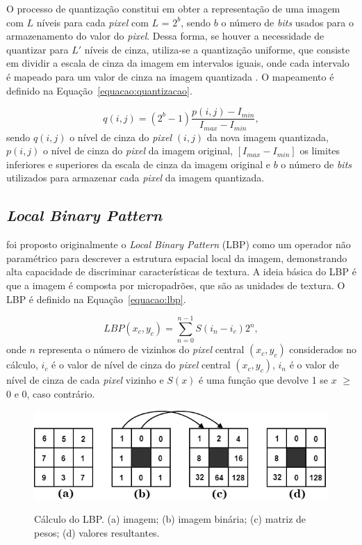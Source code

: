 O processo de quantização constitui em obter a representação de uma imagem com $L$ níveis para cada \textit{pixel} com $L$ = $2^{b}$, sendo $b$ o número de \textit{bits} usados para o armazenamento do valor do \textit{pixel}. Dessa forma, se houver a necessidade de quantizar para $L'$ níveis de cinza, utiliza-se a quantização uniforme, que consiste em dividir a escala de cinza da imagem em intervalos iguais, onde cada intervalo é mapeado para um valor de cinza na imagem quantizada \cite{gonzalez2010processamento}. O mapeamento é definido na Equação~\ref{equacao:quantizacao}.

\begin{equation}
\label{equacao:quantizacao}
q(i,j) = (2^{b} - 1) \frac{p(i,j) - I_{min}}{I_{max} - I_{min}}, 
\end{equation}
sendo $q(i,j)$ o nível de cinza do \textit{pixel} $(i,j)$ da nova imagem quantizada, $p(i,j)$ o nível de cinza do \textit{pixel} da imagem original, $[{I_{max} - I_{min}}]$ os limites inferiores e superiores da escala de cinza da imagem original e $b$ o número de \textit{bits} utilizados para armazenar cada \textit{pixel} da imagem quantizada.

\subsection{\textit{Local Binary Pattern}}

 foi proposto originalmente o \textit{Local Binary Pattern} (LBP) como um operador não paramétrico para descrever a estrutura espacial local da imagem, demonstrando alta capacidade de discriminar características de textura. A ideia básica do LBP é que a imagem é composta por micropadrões, que são as unidades de textura. O LBP é definido na Equação~\ref{equacao:lbp}.

\begin{equation}
\label{equacao:lbp}
LBP(x_{c},y_{c}) = \sum_{n=0}^{n-1}S(i_{n}-i_{c})2^{n},
\end{equation}
onde $n$ representa o número de vizinhos do \textit{pixel} central $(x_{c},y_{c})$ considerados no cálculo, $i_{c}$ é o valor de nível de cinza do \textit{pixel} central $(x_{c},y_{c})$, $i_{n}$ é o valor de nível de cinza de cada \textit{pixel} vizinho e $S(x)$ é uma função que devolve 1 se $x$ $\geq$ 0 e 0, caso contrário.

\begin{figure}[ht!]
    \centering
    \caption{Cálculo do LBP. (a) imagem; (b) imagem binária; (c) matriz de pesos; (d) valores resultantes.}
    \includegraphics[width=12cm]{figs/LBP2.png}
    \label{fig:lbp}
\end{figure}

